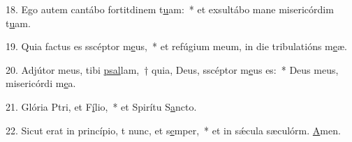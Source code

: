 18. Ego autem cantábo fortitdinem t\uline{u}am:~* et exsultábo mane misericórdim t\uline{u}am.\par 
19. Quia factus es sscéptor m\uline{e}us,~* et refúgium meum, in die tribulatións m\uline{e}æ.\par 
20. Adjútor meus, tibi \uline{psal}lam,~† quia, Deus, sscéptor m\uline{e}us es:~* Deus meus, misericórdi m\uline{e}a.\par 
21. Glória Ptri, et F\uline{í}lio,~* et Spirítu S\uline{a}ncto.\par 
22. Sicut erat in princípio, t nunc, et s\uline{e}mper,~* et in sǽcula sæculórm. \uline{A}men.\par 
